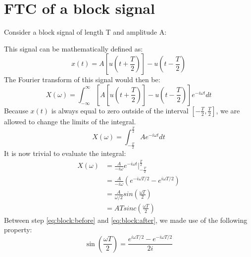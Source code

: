 \documentclass[]{subfiles}
\begin{document}
	\section{FTC of a block signal}
	Consider a block signal of length T and amplitude A:\\

	\begin{figure}[h]
		\centering
	\end{figure}
	This signal can be mathematically defined as:
	\begin{equation*}
		x(t) = A\left[ u(t+\frac{T}{2})\right] -u(t-\frac{T}{2})
	\end{equation*}
	The Fourier transform of this signal would then be:
	\begin{equation*}
		X(\omega) = \int_{-\infty}^{\infty}\left[ A\left[ u(t+\frac{T}{2})\right] -u(t-\frac{T}{2})\right] e^{-i\omega t}dt
	\end{equation*}
	Because $x(t)$ is always equal to zero outside of the interval $\left[ -\frac{T}{2},\frac{T}{2}\right] $, we are allowed to change the limits of the integral.
	\begin{equation*}
		X(\omega) = \int_{-\frac{T}{2}}^{\frac{T}{2}}A e^{-i\omega t}dt
	\end{equation*}
	It is now trivial to evaluate the integral:
	\begin{align}
		X(\omega)&=\frac{A}{-i\omega}e^{-i\omega t} \bigg\vert_{-\frac{T}{2}}^{\frac{T}{2}}\\
		\label{eq:block:before}
		&= \frac{A}{-i\omega}(e^{-i\omega T/2}-e^{i\omega T/2})\\
		\label{eq:block:after}
		&= \frac{A}{\omega/2}sin(\frac{\omega T}{2})\\
		&=ATsinc(\frac{\omega T}{2})
	\end{align}
	Between step \ref{eq:block:before} and \ref{eq:block:after}, we made use of the following property:
	\begin{equation*}
		\sin(\frac{\omega T}{2}) = \frac{e^{i\omega T/2}-e^{-i\omega T/2}}{2i}
	\end{equation*}
\end{document}
